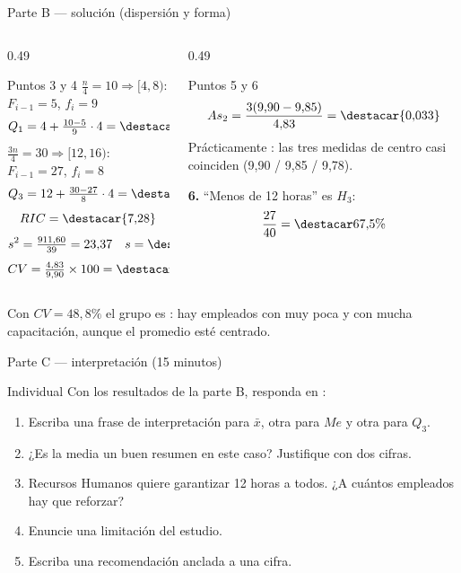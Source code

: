 \documentclass[aspectratio=169,10pt]{beamer}
\begin{document}
\begin{frame}{Parte B — solución (dispersión y forma)}
  \scriptsize
  \begin{columns}[T,onlytextwidth]
    \begin{column}{0.49\textwidth}
      \begin{block}{Puntos 3 y 4}
        \scriptsize
        $\frac{n}{4}=10 \Rightarrow [4,8)$: $F_{i-1}=5$, $f_i=9$
        \[ Q_1 = 4+\tfrac{10-5}{9}\cdot4 = \destacar{6{,}22} \]
        $\frac{3n}{4}=30 \Rightarrow [12,16)$: $F_{i-1}=27$, $f_i=8$
        \[ Q_3 = 12+\tfrac{30-27}{8}\cdot4 = \destacar{13{,}50} \]
        \[ RIC = \destacar{7{,}28} \]
        \[ s^2 = \tfrac{911{,}60}{39} = 23{,}37 \quad
           s = \destacar{4{,}83} \]
        \[ CV = \tfrac{4{,}83}{9{,}90}\times100 = \destacar{48{,}8\%} \]
      \end{block}
    \end{column}
    \begin{column}{0.49\textwidth}
      \begin{exampleblock}{Puntos 5 y 6}
        \scriptsize
        \[ As_2 = \frac{3(9{,}90-9{,}85)}{4{,}83} = \destacar{0{,}033} \]
        Prácticamente : las tres medidas de centro casi
        coinciden (9,90 / 9,85 / 9,78).

        \vspace{0.15cm}
        \textbf{6.} ``Menos de 12 horas'' es $H_3$:
        \[ \frac{27}{40} = \destacar{67{,}5\%} \]
      \end{exampleblock}
    \end{column}
  \end{columns}

  \vspace{0.05cm}
  {\tiny\color{uniGris} Con $CV = 48{,}8\%$ el grupo es : hay empleados con muy poca y con mucha capacitación, aunque el
  promedio esté centrado.}
\end{frame}

\begin{frame}{Parte C — interpretación (15 minutos)}
  \begin{alertblock}{Individual}
    \scriptsize
    Con los resultados de la parte B, responda en :

    \vspace{0.2cm}
    \begin{enumerate}\setlength{\itemsep}{-0.05cm}
      \item Escriba una frase de interpretación para $\bar{x}$, otra para $Me$
            y otra para $Q_3$.
      \item ¿Es la media un buen resumen en este caso? Justifique con dos
            cifras.
      \item Recursos Humanos quiere garantizar 12 horas a todos.
            ¿A cuántos empleados hay que reforzar?
      \item Enuncie una limitación del estudio.
      \item Escriba una recomendación anclada a una cifra.
    \end{enumerate}
  \end{alertblock}
\end{frame}
\end{document}
